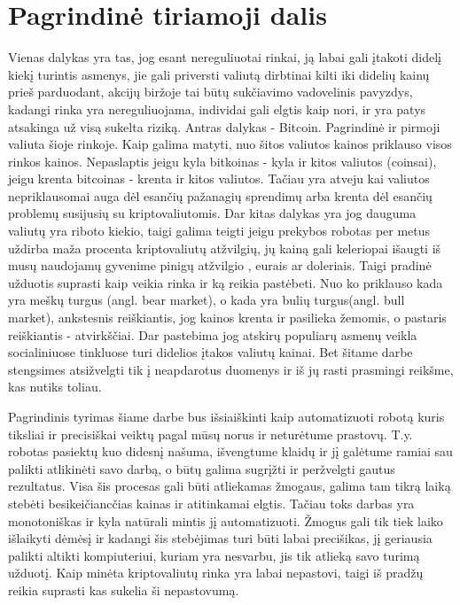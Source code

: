 \documentclass{VUMIFInfKursinis}
\begin{document}
\section{Pagrindinė tiriamoji dalis}
Vienas dalykas yra tas, jog esant nereguliuotai rinkai, ją labai gali įtakoti didelį kiekį turintis asmenys, jie gali priversti valiutą
dirbtinai kilti iki didelių kainų prieš parduodant, akcijų biržoje tai būtų sukčiavimo vadovelinis pavyzdys, kadangi rinka yra nereguliuojama, 
individai gali elgtis kaip nori, ir yra patys atsakinga už visą sukelta riziką. Antras dalykas - Bitcoin. Pagrindinė ir pirmoji valiuta
šioje rinkoje. Kaip galima matyti, nuo šitos valiutos kainos priklauso visos rinkos kainos. Nepaslaptis jeigu kyla bitkoinas - kyla ir kitos 
valiutos (coinsai), jeigu krenta bitcoinas - krenta ir kitos valiutos. Tačiau yra atveju kai valiutos nepriklausomai auga dėl esančių pažanagių
sprendimų arba krenta dėl esančių problemų susijusių su kriptovaliutomis. Dar kitas dalykas yra jog dauguma valiutų yra riboto kiekio, taigi galima
teigti jeigu prekybos robotas per metus uždirba maža procenta kriptovaliutų atžvilgių, jų kainą gali keleriopai išaugti iš musų naudojamų gyvenime 
pinigų atžvilgio , eurais ar doleriais. Taigi pradinė užduotis suprasti kaip veikia rinka ir ką reikia pastėbeti. Nuo ko priklauso kada yra meškų turgus 
(angl. bear market), o kada yra bulių turgus(angl. bull market), ankstesnis reiškiantis, jog kainos krenta ir pasilieka žemomis, o 
pastaris reiškiantis - atvirkščiai. Dar pastebima jog atskirų populiarų asmenų veikla socialiniuose tinkluose turi didelios įtakos valiutų kainai.
Bet šitame darbe stengsimes atsižvelgti tik į neapdarotus duomenys ir iš jų rasti prasmingi reikšme, kas nutiks toliau. 

Pagrindinis tyrimas šiame darbe bus išsiaiškinti kaip automatizuoti robotą kuris tiksliai ir precisiškai veiktų pagal mūsų norus ir neturėtume
prastovų. T.y. robotas pasiektų kuo didesnį našuma, išvengtume klaidų ir jį galėtume ramiai sau palikti atlikinėti savo darbą, o būtų galima sugrįžti 
ir peržvelgti gautus rezultatus. Visa šis procesas gali būti atliekamas žmogaus, galima tam tikrą laiką stebėti besikeičiancčias kainas ir atitinkamai elgtis.
Tačiau toks darbas yra monotoniškas ir kyla natūrali mintis jį automatizuoti. Žmogus gali tik tiek laiko išlaikyti dėmėsį ir kadangi šis stebėjimas turi būti labai precišikas,
jį geriausia palikti altikti kompiuteriui, kuriam yra nesvarbu, jis tik atlieką savo turimą užduotį. Kaip minėta kriptovaliutų rinka yra labai nepastovi, taigi iš pradžų
reikia suprasti kas sukelia ši nepastovumą.
\end{document}
